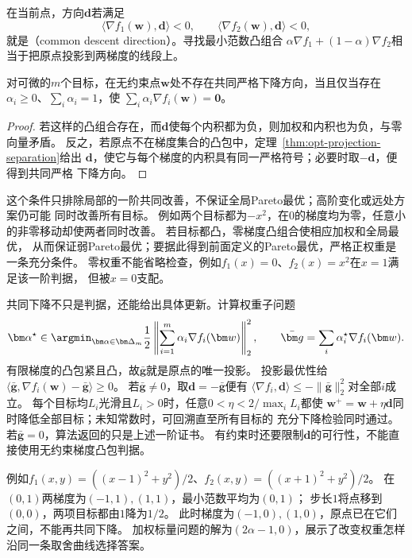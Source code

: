 在当前点，方向$\bm{d}$若满足
\[
  \langle\nabla f_1(\bm{w}),\bm{d}\rangle<0,\qquad
  \langle\nabla f_2(\bm{w}),\bm{d}\rangle<0,
\]
就是（common descent direction）。寻找最小范数凸组合
$\alpha\nabla f_1+(1-\alpha)\nabla f_2$相当于把原点投影到两梯度的线段上。

\begin{theorem}[无共同下降方向的一阶判定]
\label{thm:opt-common-descent}
对可微的$m$个目标，在无约束点$\bm{w}$处不存在共同严格下降方向，当且仅当存在
$\alpha_i\geq0$、$\sum_i\alpha_i=1$，使
$\sum_i\alpha_i\nabla f_i(\bm{w})=\bm{0}$。
\end{theorem}

\begin{proof}
若这样的凸组合存在，而$\bm{d}$使每个内积都为负，则加权和内积也为负，与零向量矛盾。
反之，若原点不在梯度集合的凸包中，定理~\ref{thm:opt-projection-separation}给出
$\bm{d}$，使它与每个梯度的内积具有同一严格符号；必要时取$-\bm{d}$，便得到共同严格
下降方向。
\end{proof}

这个条件只排除局部的一阶共同改善，不保证全局Pareto最优；高阶变化或远处方案仍可能
同时改善所有目标。
例如两个目标都为$-x^2$，在$0$的梯度均为零，任意小的非零移动却使两者同时改善。
若目标都凸，零梯度凸组合使相应加权和全局最优，
从而保证弱Pareto最优；要据此得到前面定义的Pareto最优，严格正权重是一条充分条件。
零权重不能省略检查，例如$f_1(x)=0$、$f_2(x)=x^2$在$x=1$满足该一阶判据，
但被$x=0$支配。

共同下降不只是判据，还能给出具体更新。计算权重子问题
\[
 \bm\alpha^\star\in\argmin_{\bm\alpha\in\bm\Delta_m}
 \frac12\left\|\sum_{i=1}^m\alpha_i\nabla f_i(\bm w)\right\|_2^2,
 \qquad
 \bar{\bm g}=\sum_i\alpha_i^\star\nabla f_i(\bm w).
\]
有限梯度的凸包紧且凸，故$\bar{\bm g}$就是原点的唯一投影。
投影最优性给
$\langle\bar{\bm g},\nabla f_i(\bm w)-\bar{\bm g}\rangle\geq0$。
若$\bar{\bm g}\neq0$，取$\bm d=-\bar{\bm g}$便有
$\langle\nabla f_i,\bm d\rangle\leq-\|\bar{\bm g}\|_2^2$对全部$i$成立。
每个目标均$L_i$光滑且$L_i>0$时，任意$0<\eta<2/\max_i L_i$都使
$\bm w^+=\bm w+\eta\bm d$同时降低全部目标；未知常数时，可回溯直至所有目标的
充分下降检验同时通过。若$\bar{\bm g}=0$，算法返回的只是上述一阶证书。
有约束时还要限制$\bm d$的可行性，不能直接使用无约束梯度凸包判据。

例如$f_1(x,y)=((x-1)^2+y^2)/2$、$f_2(x,y)=((x+1)^2+y^2)/2$。
在$(0,1)$两梯度为$(-1,1),(1,1)$，最小范数平均为$(0,1)$；
步长$1$将点移到$(0,0)$，两项目标都由$1$降为$1/2$。
此时梯度为$(-1,0),(1,0)$，原点已在它们之间，不能再共同下降。
加权标量问题的解为$(2\alpha-1,0)$，展示了改变权重怎样沿同一条取舍曲线选择答案。

